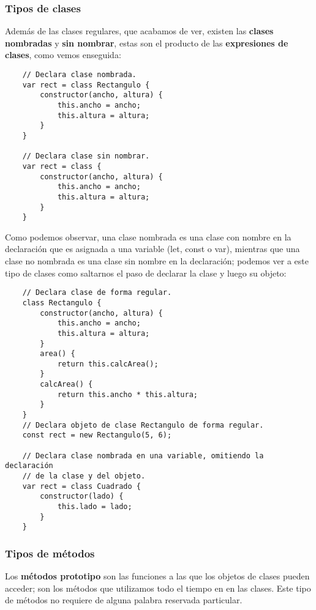 \subsubsection{Tipos de clases}
\hspace{0.55cm}Además de las clases regulares, que acabamos de ver, existen las \textbf{clases nombradas} y \textbf{sin nombrar}, estas son el producto de las \textbf{expresiones de clases}, como vemos enseguida:
\begin{lstlisting}
    // Declara clase nombrada.
    var rect = class Rectangulo {
        constructor(ancho, altura) {
            this.ancho = ancho;
            this.altura = altura;
        }
    }

    // Declara clase sin nombrar.
    var rect = class {
        constructor(ancho, altura) {
            this.ancho = ancho;
            this.altura = altura;
        }
    }
\end{lstlisting}

Como podemos observar, una clase nombrada es una clase con nombre en la declaración que es asignada a una variable (let, const o var), mientras que una clase no nombrada es una clase sin nombre en la declaración; podemos ver a este tipo de clases como saltarnos el paso de declarar la clase y luego su objeto:
\begin{lstlisting}
    // Declara clase de forma regular.
    class Rectangulo {
        constructor(ancho, altura) {
            this.ancho = ancho;
            this.altura = altura;
        }
        area() {
            return this.calcArea();
        }
        calcArea() {
            return this.ancho * this.altura;
        }
    }
    // Declara objeto de clase Rectangulo de forma regular.
    const rect = new Rectangulo(5, 6);

    // Declara clase nombrada en una variable, omitiendo la declaración
    // de la clase y del objeto.
    var rect = class Cuadrado {
        constructor(lado) {
            this.lado = lado;
        }
    }
\end{lstlisting}


\subsubsection{Tipos de métodos}
\hspace{0.55cm}Los \textbf{métodos prototipo} son las funciones a las que los objetos de clases pueden acceder; son los métodos que utilizamos todo el tiempo en en las clases. Este tipo de métodos no requiere de alguna palabra reservada particular.

